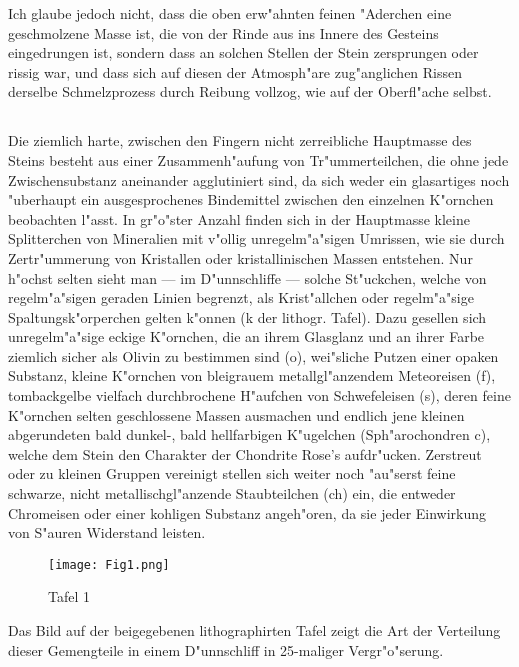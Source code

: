 \documentclass[a4paper, 11pt, oneside]{article}
\begin{document}
Ich glaube jedoch nicht, dass die oben erw"ahnten feinen "Aderchen eine geschmolzene Masse ist, die von der Rinde aus ins Innere des Gesteins eingedrungen ist, sondern dass an solchen Stellen der Stein zersprungen oder rissig war, und dass sich auf diesen der Atmosph"are zug"anglichen Rissen derselbe Schmelzprozess durch Reibung vollzog, wie auf der Oberfl"ache selbst.
\clearpage
\subsection{}
\paragraph{}
Die ziemlich harte, zwischen den Fingern nicht zerreibliche Hauptmasse des Steins besteht aus einer Zusammenh"aufung von Tr"ummerteilchen, die ohne jede Zwischensubstanz aneinander agglutiniert sind, da sich weder ein glasartiges noch "uberhaupt ein ausgesprochenes Bindemittel zwischen den einzelnen K"ornchen beobachten l"asst. In gr"o"ster Anzahl finden sich in der Hauptmasse kleine Splitterchen von Mineralien mit v"ollig unregelm"a"sigen Umrissen, wie sie durch Zertr"ummerung von Kristallen oder kristallinischen Massen entstehen. Nur h"ochst selten sieht man --- im D"unnschliffe --- solche St"uckchen, welche von regelm"a"sigen geraden Linien begrenzt, als Krist"allchen oder regelm"a"sige Spaltungsk"orperchen gelten k"onnen (k der lithogr. Tafel). Dazu gesellen sich unregelm"a"sige eckige K"ornchen, die an ihrem Glasglanz und an ihrer Farbe ziemlich sicher als Olivin zu bestimmen sind (o), wei"sliche Putzen einer opaken Substanz, kleine K"ornchen von bleigrauem metallgl"anzendem Meteoreisen (f), tombackgelbe vielfach durchbrochene H"aufchen von Schwefeleisen (s), deren feine K"ornchen selten geschlossene Massen ausmachen und endlich jene kleinen abgerundeten bald dunkel-, bald hellfarbigen K"ugelchen (Sph"arochondren c), welche dem Stein den Charakter der Chondrite Rose's aufdr"ucken. Zerstreut oder zu kleinen Gruppen vereinigt stellen sich weiter noch "au"serst feine schwarze, nicht metallischgl"anzende Staubteilchen (ch) ein, die entweder Chromeisen oder einer kohligen Substanz angeh"oren, da sie jeder Einwirkung von S"auren Widerstand leisten.
\clearpage
\begin{figure}[t]
\centering
\texttt{[image: Fig1.png]}
\caption{Tafel 1}
\end{figure}
Das Bild auf der beigegebenen lithographirten Tafel zeigt die Art der Verteilung dieser Gemengteile in einem D"unnschliff in 25-maliger Vergr"o"serung.
\end{document}
